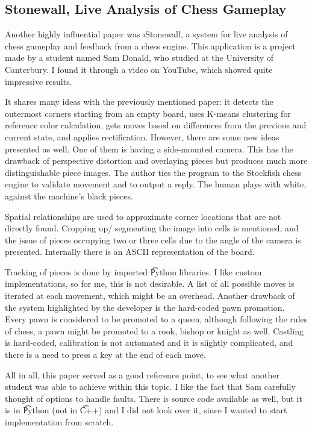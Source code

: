 
\subsection{Stonewall, Live Analysis of Chess Gameplay} \label{subsec:stonewall-live-analysis-of-chess-gameplay}

Another highly influential paper was \i{Stonewall, a system for live analysis of chess gameplay and feedback from a chess engine}\cite{stonewall}. This application is a project made by a student named Sam Donald, who studied at the University of Canterbury. I found it through a video on YouTube, which showed quite impressive results.

It shares many ideas with the previously mentioned paper: it detects the outermost corners starting from an empty board, uses K-means clustering for reference color calculation, gets moves based on differences from the previous and current state, and applies rectification. However, there are some new ideas presented as well. One of them is having a \b{side-mounted camera}. This has the drawback of perspective distortion and overlaying pieces but produces much more distinguishable piece images. The author ties the program to the Stockfish chess engine to validate movement and to output a reply. The human plays with white, against the machine's black pieces.

Spatial relationships are used to approximate corner locations that are not directly found. Cropping up/ segmenting the image into cells is mentioned, and the \b{issue of pieces occupying two or three cells} due to the angle of the camera is presented. Internally there is an ASCII representation of the board.

Tracking of pieces is done by imported \t{Python} libraries. I like custom implementations, so for me, this is not desirable. A list of all possible moves is iterated at each movement, which might be an overhead. Another drawback of the system highlighted by the developer is the hard-coded \b{pawn promotion}. Every pawn is considered to be promoted to a queen, although following the rules of chess, a pawn might be promoted to a rook, bishop or knight as well. Castling is hard-coded, calibration is not automated and it is slightly complicated, and there is a need to press a key at the end of each move.

All in all, this paper served as a good reference point, to see what another student was able to achieve within this topic. I like the fact that Sam carefully thought of options to handle faults. There is source code available as well, but it is in \t{Python} (not in \t{C++}) and I did not look over it, since I wanted to start implementation from scratch.


